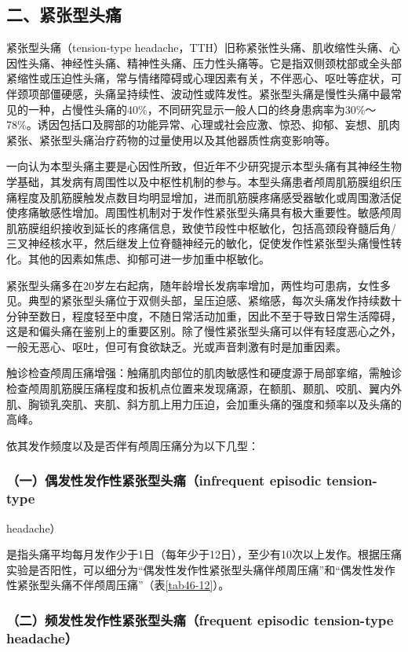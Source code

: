 \subsection{二、紧张型头痛}

紧张型头痛（tension-type
headache，TTH）旧称紧张性头痛、肌收缩性头痛、心因性头痛、神经性头痛、精神性头痛、压力性头痛等。它是指双侧颈枕部或全头部紧缩性或压迫性头痛，常与情绪障碍或心理因素有关，不伴恶心、呕吐等症状，可伴颈项部僵硬感，头痛呈持续性、波动性或阵发性。紧张型头痛是慢性头痛中最常见的一种，占慢性头痛的40\%，不同研究显示一般人口的终身患病率为30\%～78\%。诱因包括口及腭部的功能异常、心理或社会应激、惊恐、抑郁、妄想、肌肉紧张、紧张型头痛治疗药物的过量使用以及其他器质性病变影响等。

一向认为本型头痛主要是心因性所致，但近年不少研究提示本型头痛有其神经生物学基础，其发病有周围性以及中枢性机制的参与。本型头痛患者颅周肌筋膜组织压痛程度及肌筋膜触发点数目均明显增加，进而肌筋膜疼痛感受器敏化或周围激活促使疼痛敏感性增加。周围性机制对于发作性紧张型头痛具有极大重要性。敏感颅周肌筋膜组织接收到延长的疼痛信息，致使节段性中枢敏化，包括高颈段脊髓后角/三叉神经核水平，然后继发上位脊髓神经元的敏化，促使发作性紧张型头痛慢性转化。其他的因素如焦虑、抑郁可进一步加重中枢敏化。

紧张型头痛多在20岁左右起病，随年龄增长发病率增加，两性均可患病，女性多见。典型的紧张型头痛位于双侧头部，呈压迫感、紧缩感，每次头痛发作持续数十分钟至数日，程度轻至中度，不随日常活动加重，因此不至于导致日常生活障碍，这是和偏头痛在鉴别上的重要区别。除了慢性紧张型头痛可以伴有轻度恶心之外，一般无恶心、呕吐，但可有食欲缺乏。光或声音刺激有时是加重因素。

触诊检查颅周压痛增强：触痛肌肉部位的肌肉敏感性和硬度源于局部挛缩，需触诊检查颅周肌筋膜压痛程度和扳机点位置来发现痛源，在额肌、颞肌、咬肌、翼内外肌、胸锁乳突肌、夹肌、斜方肌上用力压迫，会加重头痛的强度和频率以及头痛的高峰。

依其发作频度以及是否伴有颅周压痛分为以下几型：

\subsubsection{（一）偶发性发作性紧张型头痛（infrequent episodic tension-type}
headache）

是指头痛平均每月发作少于1日（每年少于12日），至少有10次以上发作。根据压痛实验是否阳性，可以细分为“偶发性发作性紧张型头痛伴颅周压痛”和“偶发性发作性紧张型头痛不伴颅周压痛”（表\ref{tab46-12}）。

\subsubsection{（二）频发性发作性紧张型头痛（frequent episodic tension-type headache）}

